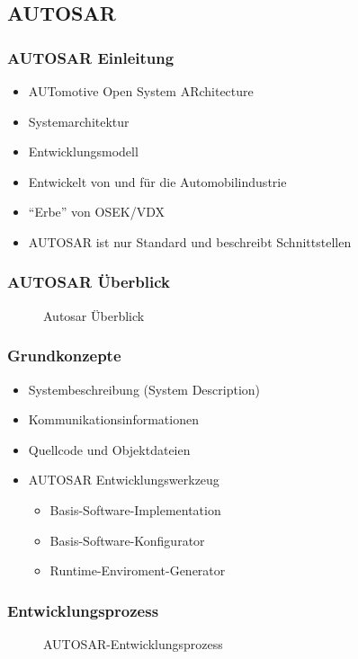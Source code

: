\documentclass[]{beamer}
\newcommand{\inputImage}[1]{}
\begin{document}
\subsection{AUTOSAR}

\begin{frame}
\frametitle{AUTOSAR Einleitung}
    \begin{itemize}
        \item AUTomotive Open System ARchitecture
        \item Systemarchitektur
        \item Entwicklungsmodell
        \item Entwickelt von und für die Automobilindustrie
        \item "`Erbe"' von OSEK/VDX
        \item AUTOSAR ist nur Standard und beschreibt Schnittstellen
    \end{itemize}
\end{frame}

\begin{frame}[plain]
\frametitle{AUTOSAR Überblick}
    \begin{figure}[p]
        \centering
        \resizebox{0.6\linewidth}{!}{\inputImage{autosar_overview.dia}}
        \caption{Autosar Überblick}
        \label{fig:autosar_overview}
    \end{figure}
\end{frame}

\begin{frame}
\frametitle{Grundkonzepte}
    \begin{itemize}
        \item Systembeschreibung (System Description)
        \item Kommunikationsinformationen
        \item Quellcode und Objektdateien
        \item AUTOSAR Entwicklungswerkzeug
        \begin{itemize}
            \item Basis-Software-Implementation
            \item Basis-Software-Konfigurator
            \item Runtime-Enviroment-Generator
        \end{itemize}
    \end{itemize}
\end{frame}

\begin{frame}
\frametitle{Entwicklungsprozess}
    \begin{figure}[ht]
        \centering
        \resizebox{0.98\linewidth}{!}{\inputImage{Autosar_Prozess.dia}}
        \caption{AUTOSAR-Entwicklungsprozess}
        \label{fig:autosar_prozess}
    \end{figure}
\end{frame}
\end{document}
